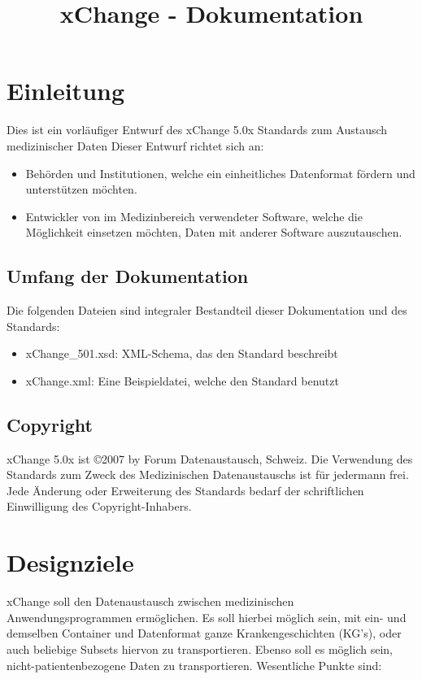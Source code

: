 \documentclass[a4paper]{scrartcl}
\begin{document}
\title{xChange - Dokumentation}
\maketitle
\section{Einleitung}
Dies ist ein vorläufiger Entwurf des xChange 5.0x Standards zum Austausch medizinischer Daten
Dieser Entwurf richtet sich an:
\begin{itemize}
    \item Behörden und Institutionen, welche ein einheitliches Datenformat fördern und unterstützen möchten.
    \item Entwickler von im Medizinbereich verwendeter Software, welche die Möglichkeit einsetzen möchten, Daten mit anderer Software auszutauschen.
\end{itemize}

\subsection{Umfang der Dokumentation}
Die folgenden Dateien sind integraler Bestandteil dieser Dokumentation und des Standards:
\begin{itemize}
    \item xChange\_501.xsd: XML-Schema, das den Standard beschreibt
    \item xChange.xml: Eine Beispieldatei, welche den Standard benutzt
\end{itemize}

\subsection{Copyright}
xChange 5.0x ist \copyright 2007 by Forum Datenaustausch, Schweiz. Die Verwendung des Standards zum Zweck des Medizinischen Datenaustauschs ist für jedermann frei.
Jede Änderung oder Erweiterung des Standards bedarf der schriftlichen Einwilligung des Copyright-Inhabers. 

\section{Designziele}
xChange soll den Datenaustausch zwischen medizinischen Anwendungsprogrammen ermöglichen. Es soll hierbei möglich sein, mit ein- und demselben Container und Datenformat ganze Krankengeschichten (KG's), oder auch beliebige Subsets hiervon zu transportieren. Ebenso soll es möglich sein, nicht-patientenbezogene Daten zu transportieren. Wesentliche Punkte sind:
\end{document}
